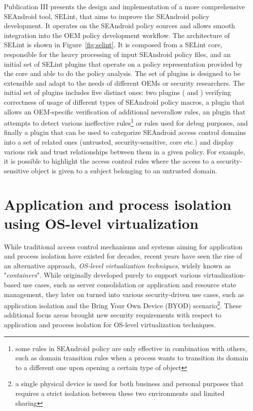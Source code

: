 Publication III presents the design and implementation of a more comprehensive SEAndroid tool, SELint, that aims to improve the SEAndroid policy development. It operates on the SEAndroid policy sources and allows smooth integration into the OEM policy development workflow. The architecture of SELint is shown in Figure~\ref{fig:selint}. It is composed from a SELint core, responsible for the heavy processing of input SEAndroid policy files, and an initial set of SELint plugins that operate on a policy representation provided by the core and able to do the policy analysis. The set of plugins is designed to be extensible and adapt to the needs of different OEMs or security researchers. The initial set of plugins includes five distinct ones: two plugins ( and ) verifying correctness of usage of different types of SEAndroid policy macros, a  plugin that allows an OEM-specific verification of additional neverallow rules, an  plugin that attempts to detect various ineffective rules\footnote{some rules in SEAndroid policy are only effective in combination with others, such as domain transition rules when a process wants to transition its domain to a different one upon opening a certain type of object} or rules used for debug purposes, and finally a  plugin that can be used to categorize SEAndroid access control domains into a set of related ones (untrusted, security-sensitive, core etc.) and display various risk and trust relationships between them in a given policy. For example, it is possible to highlight the access control rules where the access to a security-sensitive object is given to a subject belonging to an untrusted domain.


\section{Application and process isolation using OS-level virtualization}
\label{sec:os-virt}

While traditional access control mechanisms and systems aiming for application and process isolation have existed for decades, recent years have seen the rise of an alternative approach, \textit{OS-level virtualization techniques}, widely known as "\textit{containers}". While originally developed purely to support various virtualization-based use cases, such as server consolidation or application and resource state management, they later on turned into various security-driven use cases, such as application isolation and the Bring Your Own Device (BYOD) scenario\footnote{a single physical device is used for both business and personal purposes that requires a strict isolation between these two environments and limited sharing}. These additional focus areas brought new security requirements with respect to application and process isolation for OS-level virtualization techniques.

